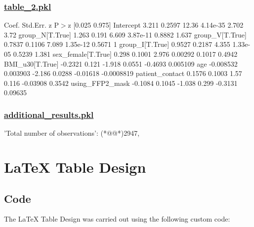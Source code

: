 \documentclass[11pt]{article}
\begin{document}
\subsubsection*{\hyperlink{code-Data Analysis-table-2-pkl}{table\_2.pkl}}

\begin{codeoutput}
                       Coef.  Std.Err.      z     P$>$\textbar{}z\textbar{}   [0.025     0.975]
Intercept              3.211    0.2597  12.36  4.14e-35    2.702       3.72
group\_N[T.True]        1.263     0.191  6.609  3.87e-11   0.8882      1.637
group\_V[T.True]       0.7837    0.1106  7.089  1.35e-12   0.5671          1
group\_I[T.True]       0.9527    0.2187  4.355  1.33e-05   0.5239      1.381
sex\_female[T.True]     0.298    0.1001  2.976   0.00292   0.1017     0.4942
BMI\_u30[T.True]      -0.2321     0.121 -1.918    0.0551  -0.4693   0.005109
age                -0.008532  0.003903 -2.186    0.0288 -0.01618 -0.0008819
patient\_contact       0.1576    0.1003   1.57     0.116 -0.03908     0.3542
using\_FFP2\_mask      -0.1084    0.1045 -1.038     0.299  -0.3131    0.09635
\end{codeoutput}\hypertarget{file-additional-results-pkl}{}

\subsubsection*{\hyperlink{code-Data Analysis-additional-results-pkl}{additional\_results.pkl}}

\begin{codeoutput}
{
    'Total number of observations': (*@@*)2947,
}
\end{codeoutput}

\section{LaTeX Table Design}
\subsection{{Code}}
The LaTeX Table Design was carried out using the following custom code:
\end{document}
